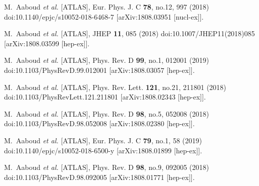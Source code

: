 \begin{thebibliography}{9}
M.~Aaboud \textit{et al.} [ATLAS],
Eur. Phys. J. C \textbf{78}, no.12, 997 (2018)
doi:10.1140/epjc/s10052-018-6468-7
[arXiv:1808.03951 [nucl-ex]].

M.~Aaboud \textit{et al.} [ATLAS],
JHEP \textbf{11}, 085 (2018)
doi:10.1007/JHEP11(2018)085
[arXiv:1808.03599 [hep-ex]].

M.~Aaboud \textit{et al.} [ATLAS],
Phys. Rev. D \textbf{99}, no.1, 012001 (2019)
doi:10.1103/PhysRevD.99.012001
[arXiv:1808.03057 [hep-ex]].

M.~Aaboud \textit{et al.} [ATLAS],
Phys. Rev. Lett. \textbf{121}, no.21, 211801 (2018)
doi:10.1103/PhysRevLett.121.211801
[arXiv:1808.02343 [hep-ex]].

M.~Aaboud \textit{et al.} [ATLAS],
Phys. Rev. D \textbf{98}, no.5, 052008 (2018)
doi:10.1103/PhysRevD.98.052008
[arXiv:1808.02380 [hep-ex]].

M.~Aaboud \textit{et al.} [ATLAS],
Eur. Phys. J. C \textbf{79}, no.1, 58 (2019)
doi:10.1140/epjc/s10052-018-6500-y
[arXiv:1808.01899 [hep-ex]].

M.~Aaboud \textit{et al.} [ATLAS],
Phys. Rev. D \textbf{98}, no.9, 092005 (2018)
doi:10.1103/PhysRevD.98.092005
[arXiv:1808.01771 [hep-ex]].


\end{thebibliography}
